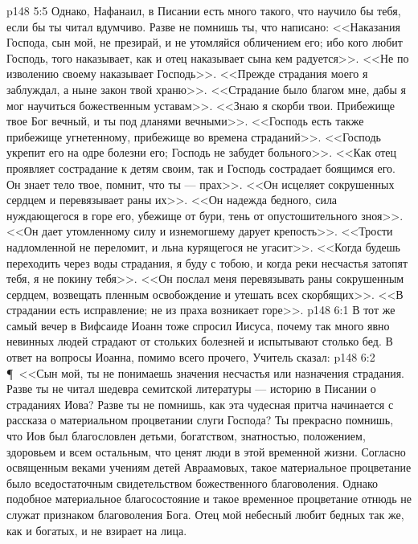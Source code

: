 \vs p148 5:5 Однако, Нафанаил, в Писании есть много такого, что научило бы тебя, если бы ты читал вдумчиво. Разве не помнишь ты, что написано: <<Наказания Господа, сын мой, не презирай, и не утомляйся обличением его; ибо кого любит Господь, того наказывает, как и отец наказывает сына кем радуется>>. <<Не по изволению своему наказывает Господь>>. <<Прежде страдания моего я заблуждал, а ныне закон твой храню>>. <<Страдание было благом мне, дабы я мог научиться божественным уставам>>. <<Знаю я скорби твои. Прибежище твое Бог вечный, и ты под дланями вечными>>. <<Господь есть также прибежище угнетенному, прибежище во времена страданий>>. <<Господь укрепит его на одре болезни его; Господь не забудет больного>>. <<Как отец проявляет сострадание к детям своим, так и Господь сострадает боящимся его. Он знает тело твое, помнит, что ты --- прах>>. <<Он исцеляет сокрушенных сердцем и перевязывает раны их>>. <<Он надежда бедного, сила нуждающегося в горе его, убежище от бури, тень от опустошительного зноя>>. <<Он дает утомленному силу и изнемогшему дарует крепость>>. <<Трости надломленной не переломит, и льна курящегося не угасит>>. <<Когда будешь переходить через воды страдания, я буду с тобою, и когда реки несчастья затопят тебя, я не покину тебя>>. <<Он послал меня перевязывать раны сокрушенным сердцем, возвещать пленным освобождение и утешать всех скорбящих>>. <<В страдании есть исправление; не из праха возникает горе>>.
\vs p148 6:1 В тот же самый вечер в Вифсаиде Иоанн тоже спросил Иисуса, почему так много явно невинных людей страдают от стольких болезней и испытывают столько бед. В ответ на вопросы Иоанна, помимо всего прочего, Учитель сказал:
\vs p148 6:2 \P\ <<Сын мой, ты не понимаешь значения несчастья или назначения страдания. Разве ты не читал шедевра семитской литературы --- историю в Писании о страданиях Иова? Разве ты не помнишь, как эта чудесная притча начинается с рассказа о материальном процветании слуги Господа? Ты прекрасно помнишь, что Иов был благословлен детьми, богатством, знатностью, положением, здоровьем и всем остальным, что ценят люди в этой временной жизни. Согласно освященным веками учениям детей Авраамовых, такое материальное процветание было вседостаточным свидетельством божественного благоволения. Однако подобное материальное благосостояние и такое временное процветание отнюдь не служат признаком благоволения Бога. Отец мой небесный любит бедных так же, как и богатых, и не взирает на лица.

